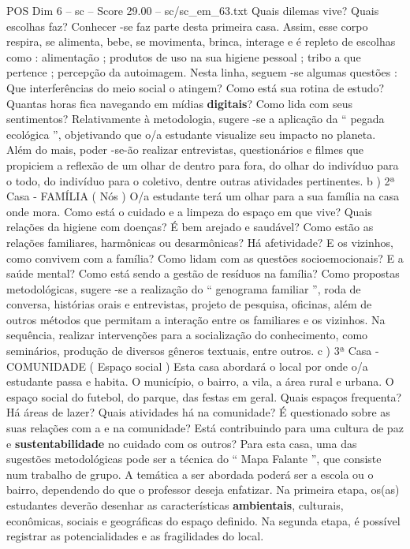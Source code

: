 \begin{textsample}{POS Dim 6 – sc – Score 29.00 – sc/sc\_em\_63.txt}
Quais dilemas vive?
Quais escolhas faz?
Conhecer -se faz parte desta primeira casa.
Assim, esse corpo respira, se alimenta, bebe, se movimenta, brinca, interage e é repleto de escolhas como : alimentação ; produtos de uso na sua higiene pessoal ; tribo a que pertence ; percepção da autoimagem.
Nesta linha, seguem -se algumas questões : Que interferências do meio social o atingem?
Como está sua rotina de estudo?
Quantas horas fica navegando em mídias \textbf{digitais}?
Como lida com seus sentimentos?
Relativamente à metodologia, sugere -se a aplicação da “ pegada ecológica ”, objetivando que o/a estudante visualize seu impacto no planeta.
Além do mais, poder -se-ão realizar entrevistas, questionários e filmes que propiciem a reflexão de um olhar de dentro para fora, do olhar do indivíduo para o todo, do indivíduo para o coletivo, dentre outras atividades pertinentes. b ) 2ª Casa - FAMÍLIA ( Nós ) O/a estudante terá um olhar para a sua família na casa onde mora.
Como está o cuidado e a limpeza do espaço em que vive?
Quais relações da higiene com doenças?
É bem arejado e saudável?
Como estão as relações familiares, harmônicas ou desarmônicas?
Há afetividade?
E os vizinhos, como convivem com a família?
Como lidam com as questões socioemocionais?
E a saúde mental?
Como está sendo a gestão de resíduos na família?
Como propostas metodológicas, sugere -se a realização do “ genograma familiar ”, roda de conversa, histórias orais e entrevistas, projeto de pesquisa, oficinas, além de outros métodos que permitam a interação entre os familiares e os vizinhos.
Na sequência, realizar intervenções para a socialização do conhecimento, como seminários, produção de diversos gêneros textuais, entre outros. c ) 3ª Casa - COMUNIDADE ( Espaço social ) Esta casa abordará o local por onde o/a estudante passa e habita.
O município, o bairro, a vila, a área rural e urbana.
O espaço social do futebol, do parque, das festas em geral.
Quais espaços frequenta?
Há áreas de lazer?
Quais atividades há na comunidade?
É questionado sobre as suas relações com a e na comunidade?
Está contribuindo para uma cultura de paz e \textbf{sustentabilidade} no cuidado com os outros?
Para esta casa, uma das sugestões metodológicas pode ser a técnica do “ Mapa Falante ”, que consiste num trabalho de grupo.
A temática a ser abordada poderá ser a escola ou o bairro, dependendo do que o professor deseja enfatizar.
Na primeira etapa, os(as) estudantes deverão desenhar as características \textbf{ambientais}, culturais, econômicas, sociais e geográficas do espaço definido.
Na segunda etapa, é possível registrar as potencialidades e as fragilidades do local.

\end{textsample}
